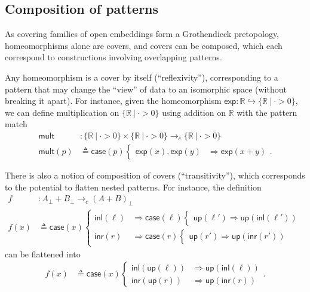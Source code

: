 \documentclass[conference]{IEEEtran}
\newcommand{\hookto}{\hookrightarrow}
\newcommand{\cto}{\to_c}
\newcommand{\R}{\mathbb{R}}
\newcommand{\suchthat}{\ |\ }
\newcommand{\Branch}{\Rightarrow}
\newcommand{\up}{\mathsf{up}}
\begin{document}
\subsection{Composition of patterns}

As covering families of open embeddings form a Grothendieck pretopology, homeomorphisms alone are covers, and covers can be composed, which each correspond to constructions involving overlapping patterns.

Any homeomorphism is a cover by itself (``reflexivity''), corresponding to a pattern that may change the ``view'' of data to an isomorphic space (without breaking it apart). For instance, given the homeomorphism $\mathsf{exp} : \R \hookto \{ \R \suchthat \cdot > 0 \}$, we can define multiplication on $\{\R \suchthat \cdot > 0 \}$ using addition on $\R$ with the pattern match
\begin{align*}
\mathsf{mult} &: \{\R \suchthat \cdot > 0 \} \times \{\R \suchthat \cdot > 0 \} \cto \{\R \suchthat \cdot > 0 \}
\\ \mathsf{mult}(p) &\triangleq \mathsf{case}(p)
\begin{cases}
\mathsf{exp}(x), \mathsf{exp}(y) &\Branch \mathsf{exp}(x + y)
\end{cases}.
\end{align*}

There is also a notion of composition of covers (``transitivity''), which corresponds to the potential to flatten nested patterns. For instance, the definition
\begin{align*}
f &: A_\bot + B_\bot \cto \left(A + B\right)_\bot
\\ f(x) &\triangleq \mathsf{case}(x)
\begin{cases}
\mathsf{inl}(\ell) &\Branch \mathsf{case}(\ell)
  \begin{cases}
  \up(\ell') \Branch \up(\mathsf{inl}(\ell'))
  \end{cases}
\\
\mathsf{inr}(r) &\Branch \mathsf{case}(r)
  \begin{cases}
  \up(r') \Branch \up(\mathsf{inr}(r'))
  \end{cases}
\end{cases}
\end{align*}
can be flattened into
\begin{align*}
f(x) &\triangleq \mathsf{case}(x)
\begin{cases}
\mathsf{inl}(\up(\ell)) &\Branch \up(\mathsf{inl}(\ell))
\\
\mathsf{inr}(\up(r)) &\Branch \up(\mathsf{inr}(r))
\end{cases}.
\end{align*}
\end{document}
